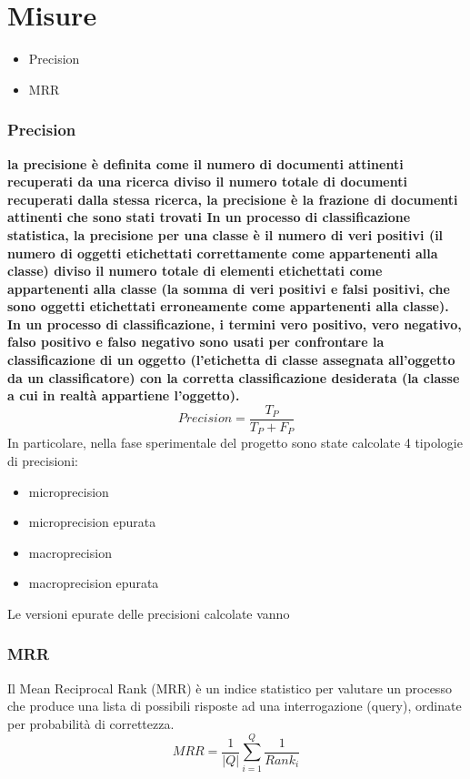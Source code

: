 \section{Misure}
\begin{itemize}
\item Precision
\item MRR
\end{itemize}
\subsubsection{Precision}
\textbf{la precisione è definita come il numero di documenti attinenti recuperati da una ricerca diviso il numero totale di documenti recuperati dalla stessa ricerca,
la precisione è la frazione di documenti attinenti che sono stati trovati
In un processo di classificazione statistica, la precisione per una classe è il numero di veri positivi (il numero di oggetti etichettati correttamente come appartenenti alla classe) diviso il numero totale di elementi etichettati come appartenenti alla classe (la somma di veri positivi e falsi positivi, che sono oggetti etichettati erroneamente come appartenenti alla classe).
In un processo di classificazione, i termini vero positivo, vero negativo, falso positivo e falso negativo sono usati per confrontare la classificazione di un oggetto (l’etichetta di classe assegnata all’oggetto da un classificatore) con la corretta classificazione desiderata (la classe a cui in realtà appartiene l’oggetto).}
$$
Precision =\frac{T_P}{T_P+F_P}
$$
In particolare, nella fase sperimentale del progetto sono state calcolate 4 tipologie di precisioni:
\begin{itemize}
\item microprecision
\item microprecision epurata
\item macroprecision
\item macroprecision epurata
\end{itemize}
Le versioni epurate delle precisioni calcolate vanno
\subsubsection{MRR}
Il Mean Reciprocal Rank (MRR) è un indice statistico per valutare un processo che produce una lista di possibili risposte ad una interrogazione (query), ordinate per probabilità di correttezza.
$$
\begin{equation}
MRR = \frac{1}{|Q|}\sum_{i=1}^{Q}{\frac{1}{Rank_i}}
\end{equation}
$$

